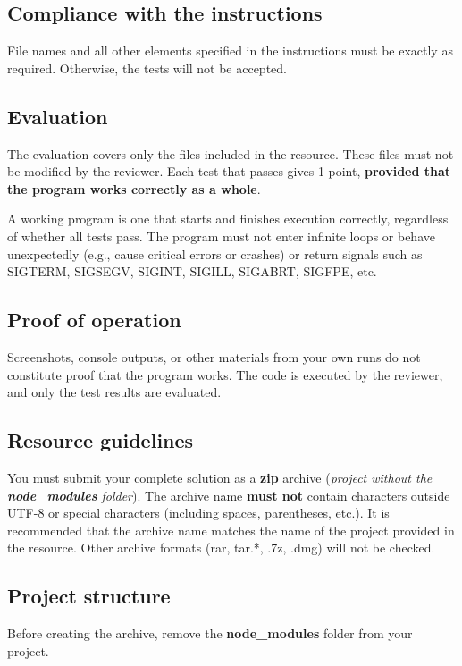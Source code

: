 \subsection*{Compliance with the instructions}
File names and all other elements specified in the instructions must be exactly as required.
Otherwise, the tests will not be accepted.

\subsection*{Evaluation}
The evaluation covers only the files included in the resource. These files must not be modified by the reviewer.
Each test that passes gives 1 point, \textbf{provided that the program works correctly as a whole}.

\begin{remarkbox}[title=Working program]
	A working program is one that starts and finishes execution correctly, regardless of whether all tests pass.
	The program must not enter infinite loops or behave unexpectedly (e.g., cause critical errors or crashes) or return signals such as SIGTERM, SIGSEGV, SIGINT, SIGILL, SIGABRT, SIGFPE, etc.
\end{remarkbox}

\subsection*{Proof of operation}
Screenshots, console outputs, or other materials from your own runs do not constitute proof that the program works.
The code is executed by the reviewer, and only the test results are evaluated.

\subsection*{Resource guidelines}
You must submit your complete solution as a \textbf{zip} archive (\textit{project without the \textbf{node\_modules} folder}).
The archive name \textbf{must not} contain characters outside UTF-8 or special characters (including spaces, parentheses, etc.).
It is recommended that the archive name matches the name of the project provided in the resource.
Other archive formats (rar, tar.*, .7z, .dmg) will not be checked.

\subsection*{Project structure}
Before creating the archive, remove the \textbf{node\_modules} folder from your project.